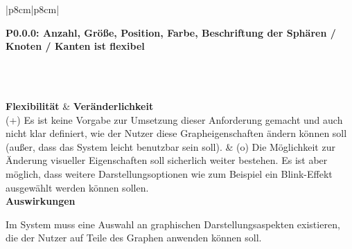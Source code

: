 \documentclass[enabledeprecatedfontcommands,fontsize=11pt,paper=a4,twoside]{scrartcl}
\newcounter{one}
\newcounter{two}[one]
\newcounter{three}[two]
\newcommand{\tone}{0\theone}
\newcommand{\ttwo}{0\thetwo}
\newcommand{\three}{\stepcounter{three}0\thethree}
\newcommand\s{\rule{0pt}{4ex}}
\begin{document}
\begin{tabular} {|p{8cm}|p{8cm}|}
	\hline
	 {\parbox{16cm}{\textbf{\hypertarget{r}{P\tone.\ttwo.\three}: Anzahl, Größe, Position, Farbe, Beschriftung der Sphären / Knoten / Kanten ist flexibel}} } \s \\ [1ex]  \hline\hline 
	\rule{0pt}{11ex}\\ [10ex] \hline
	\textbf{Flexibilität}  & \textbf{Veränderlichkeit} \\
	(+) Es ist keine Vorgabe zur Umsetzung dieser Anforderung gemacht und auch nicht klar definiert, wie der Nutzer diese Grapheigenschaften ändern können soll (außer, dass das System leicht benutzbar sein soll). &
	(o) Die Möglichkeit zur Änderung visueller Eigenschaften soll sicherlich weiter bestehen. Es ist aber möglich, dass weitere Darstellungsoptionen wie zum Beispiel ein Blink-Effekt ausgewählt werden können sollen. \\ \hline 
	 {\textbf{Auswirkungen}} \\
	 {\parbox{16cm}{Im System muss eine Auswahl an graphischen Darstellungsaspekten existieren, die der Nutzer auf Teile des Graphen anwenden können soll.} }\\ \hline
\end{tabular}
\\ \\ \\ \\ \\
\end{document}
